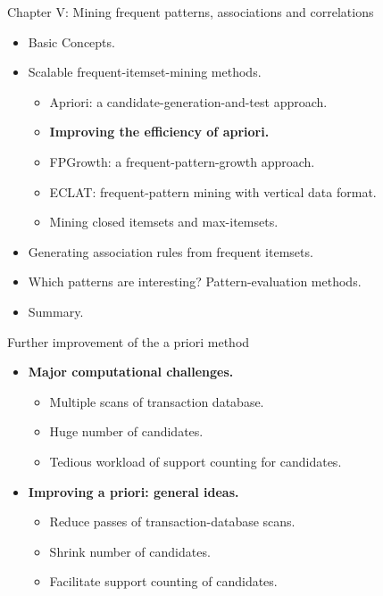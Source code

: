 \documentclass[aspectratio=169,t]{beamer}
\begin{document}
  { 
    \begin{frame}{Chapter V: Mining frequent patterns, associations and correlations}
        \begin{itemize}
            \item Basic Concepts.
            \item Scalable frequent-itemset-mining methods.
            \begin{itemize}
              \item Apriori: a candidate-generation-and-test approach.
              \item \textbf{Improving the efficiency of apriori.}
              \item FPGrowth:  a frequent-pattern-growth approach.
              \item ECLAT: frequent-pattern mining with vertical data format.
              \item Mining closed itemsets and max-itemsets.
            \end{itemize}
            \item Generating association rules from frequent itemsets.
            \item Which patterns are interesting? Pattern-evaluation methods.
            \item Summary.
        \end{itemize}
    \end{frame}
  }

  { 
    \begin{frame}{Further improvement of the a priori method}
        \begin{itemize}
            \item \textbf{Major computational challenges.}
              \begin{itemize}
                \item Multiple scans of transaction database.
                \item Huge number of candidates.
                \item Tedious workload of support counting for candidates.
              \end{itemize}
            \item \textbf{Improving a priori: general ideas.}
              \begin{itemize}
              \item Reduce passes of transaction-database scans.
              \item Shrink number of candidates.
              \item Facilitate support counting of candidates.
              \end{itemize}
        \end{itemize}
    \end{frame}
  }
\end{document}
